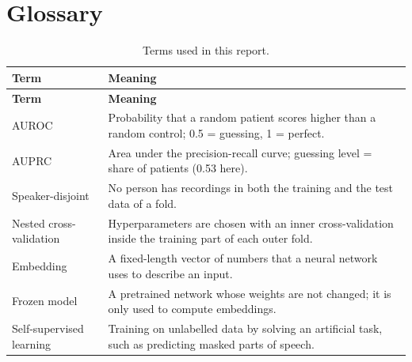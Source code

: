 \documentclass[11pt,a4paper]{article}
\begin{document}
\section{Glossary}\label{sec:app-glossary}
\begin{center}\small\renewcommand{\arraystretch}{1.15}
\begin{longtable}{>{\raggedright\arraybackslash}p{3.57cm}>{\raggedright\arraybackslash}p{12.09cm}}
\caption{Terms used in this report.}\\
\toprule
\textbf{\hspace{0pt}Term} & \textbf{\hspace{0pt}Meaning}\\\midrule\endfirsthead
\toprule
\textbf{\hspace{0pt}Term} & \textbf{\hspace{0pt}Meaning}\\\midrule\endhead
\bottomrule\endfoot
\hspace{0pt}AUROC & \hspace{0pt}Probability that a random patient scores higher than a random control; 0.5 = guessing, 1 = perfect.\\
\hspace{0pt}AUPRC & \hspace{0pt}Area under the precision-recall curve; guessing level = share of patients (0.53 here).\\
\hspace{0pt}Speaker-disjoint & \hspace{0pt}No person has recordings in both the training and the test data of a fold.\\
\hspace{0pt}Nested cross-validation & \hspace{0pt}Hyperparameters are chosen with an inner cross-validation inside the training part of each outer fold.\\
\hspace{0pt}Embedding & \hspace{0pt}A fixed-length vector of numbers that a neural network uses to describe an input.\\
\hspace{0pt}Frozen model & \hspace{0pt}A pretrained network whose weights are not changed; it is only used to compute embeddings.\\
\hspace{0pt}Self-supervised learning & \hspace{0pt}Training on unlabelled data by solving an artificial task, such as predicting masked parts of speech.\\

\end{longtable}
\end{center}
\end{document}
